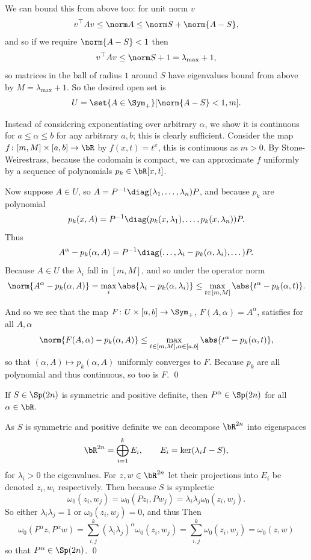     We can bound this from above too: for unit norm $v$
    $$ v^\top Av \leq \norm A \leq \norm S+\norm{A-S} , $$
    and so if we require $\norm{A-S}<1$ then
    $$ v^\top Av \leq \norm S + 1 = \lambda_{\max} + 1 , $$
    so matrices in the ball of radius $1$ around $S$ have eigenvalues bound from above by $M=\lambda_{\max}+1$.
    So the desired open set is
    $$ U = \set{A\in\Sym_+}[\norm{A-S}<1,m] . $$

    Instead of considering exponentiating over arbitrary $\alpha$, we show it is continuous for $a\leq\alpha\leq b$ for any arbitrary $a,b$; this is clearly sufficient.
    Consider the map $f\colon[m,M]\times[a,b]\to\bR$ by $f(x,t)=t^x$, this is continuous as $m>0$.
    By Stone-Weirestrass, because the codomain is compact, we can approximate $f$ uniformly by a sequence of polynomials $p_k\in\bR[x,t]$.

    Now suppose $A\in U$, so $A=P^{-1}\diag(\lambda_1,\dots,\lambda_n)P$, and because $p_k$ are polynomial
    $$ p_k(x,A) = P^{-1}\diag(p_k(x,\lambda_1),\dots,p_k(x,\lambda_n))P . $$
    Thus
    $$ A^\alpha - p_k(\alpha,A) = P^{-1}\diag(\dots,\lambda_i-p_k(\alpha,\lambda_i),\dots)P . $$
    Because $A\in U$ the $\lambda_i$ fall in $[m,M]$, and so under the operator norm
    $$ \norm{A^\alpha-p_k(\alpha,A)} = \max_i\abs{\lambda_i-p_k(\alpha,\lambda_i)} \leq \max_{t\in[m,M]}\abs{t^\alpha-p_k(\alpha,t)} . $$

    And so we see that the map $F\colon U\times[a,b]\to\Sym_+$, $F(A,\alpha)=A^\alpha$, satisfies for all $A,\alpha$
    $$ \norm{F(A,\alpha) - p_k(\alpha,A)} \leq \max_{t\in[m,M],\alpha\in[a,b]}\abs{t^\alpha-p_k(\alpha,t)} , $$
    so that $(\alpha,A)\mapsto p_k(\alpha,A)$ uniformly converges to $F$.
    Because $p_k$ are all polynomial and thus continuous, so too is $F$.
    \qed

\eproof

\blemm[name={expofsymp}]

    If $S\in\Sp(2n)$ is symmetric and positive definite, then $P^\alpha\in\Sp(2n)$ for all $\alpha\in\bR$.

\elemm

\bproof

    As $S$ is symmetric and positive definite we can decompose $\bR^{2n}$ into eigenspaces
    $$ \bR^{2n} = \bigoplus_{i=1}^k E_i,\qquad E_i = \ker(\lambda_iI-S) , $$
    for $\lambda_i>0$ the eigenvalues.
    For $z,w\in\bR^{2n}$ let their projections into $E_i$ be denoted $z_i,w_i$ respectively.
    Then because $S$ is symplectic
    $$ \omega_0(z_i,w_j) = \omega_0(Pz_i,Pw_j) = \lambda_i\lambda_j\omega_0(z_i,w_j) . $$
    So either $\lambda_i\lambda_j=1$ or $\omega_0(z_i,w_j)=0$, and thus
    Then
    $$ \omega_0(P^\alpha z,P^\alpha w) = \sum_{i,j}^k(\lambda_i\lambda_j)^\alpha\omega_0(z_i,w_j) = \sum_{i,j}^k\omega_0(z_i,w_j) = \omega_0(z,w) $$
    so that $P^\alpha\in\Sp(2n)$.
    \qed

